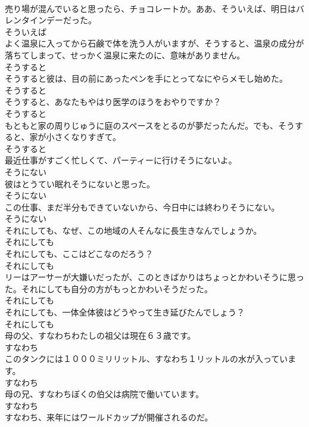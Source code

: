 \documentclass[8pt]{extreport}
\begin{document}
\begin{CJK}{UTF8}{min}
\\	売り場が混んでいると思ったら、チョコレートか。ああ、そういえば、明日はバレンタインデーだった。	
\\	そういえば
\\	よく温泉に入ってから石鹸で体を洗う人がいますが、そうすると、温泉の成分が落ちてしまって、せっかく温泉に来たのに、意味がありません。	
\\	そうすると
\\	そうすると彼は、目の前にあったペンを手にとってなにやらメモし始めた。	
\\	そうすると
\\	そうすると、あなたもやはり医学のほうをおやりですか？	
\\	そうすると
\\	もともと家の周りじゅうに庭のスペースをとるのが夢だったんだ。でも、そうすると、家が小さくなりすぎて。	
\\	そうすると
\\	最近仕事がすごく忙しくて、パーティーに行けそうにないよ。	
\\	そうにない
\\	彼はとうてい眠れそうにないと思った。	
\\	そうにない
\\	この仕事、まだ半分もできていないから、今日中には終わりそうにない。	
\\	そうにない
\\	それにしても、なぜ、この地域の人そんなに長生きなんでしょうか。	
\\	それにしても
\\	それにしても、ここはどこなのだろう？	
\\	それにしても
\\	リーはアーサーが大嫌いだったが、このときばかりはちょっとかわいそうに思った。それにしても自分の方がもっとかわいそうだった。	
\\	それにしても
\\	それにしても、一体全体彼はどうやって生き延びたんでしょう？	
\\	それにしても
\\	母の父、すなわちわたしの祖父は現在６３歳です。	
\\	すなわち
\\	このタンクには１０００ミリリットル、すなわち１リットルの水が入っています。	
\\	すなわち
\\	母の兄、すなわちぼくの伯父は病院で働いています。	
\\	すなわち
\\	すなわち、来年にはワールドカップが開催されるのだ。	

\end{CJK}
\end{document}
